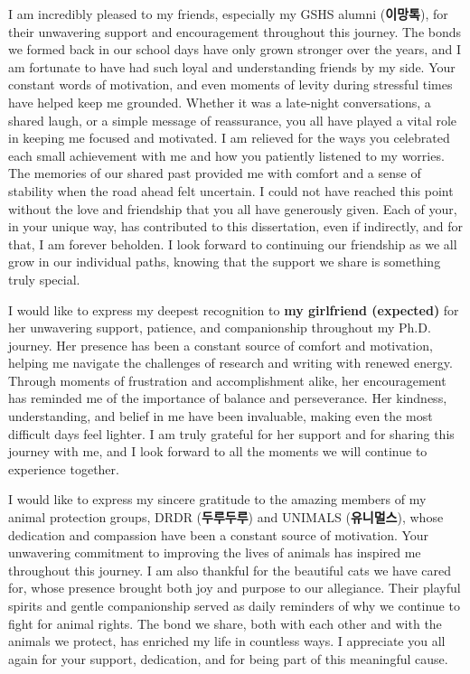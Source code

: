 \documentclass[11pt, a4paper, onecolumn, oneside]{report}
\begin{document}
        I am incredibly pleased to my friends, especially my GSHS alumni (\textbf{이망톡}), for their unwavering support and encouragement throughout this journey. The bonds we formed back in our school days have only grown stronger over the years, and I am fortunate to have had such loyal and understanding friends by my side. Your constant words of motivation, and even moments of levity during stressful times have helped keep me grounded. Whether it was a late-night conversations, a shared laugh, or a simple message of reassurance, you all have played a vital role in keeping me focused and motivated. I am relieved for the ways you celebrated each small achievement with me and how you patiently listened to my worries. The memories of our shared past provided me with comfort and a sense of stability when the road ahead felt uncertain. I could not have reached this point without the love and friendship that you all have generously given. Each of your, in your unique way, has contributed to this dissertation, even if indirectly, and for that, I am forever beholden. I look forward to continuing our friendship as we all grow in our individual paths, knowing that the support we share is something truly special.

        I would like to express my deepest recognition to \textbf{my girlfriend (expected)} for her unwavering support, patience, and companionship throughout my Ph.D. journey. Her presence has been a constant source of comfort and motivation, helping me navigate the challenges of research and writing with renewed energy. Through moments of frustration and accomplishment alike, her encouragement has reminded me of the importance of balance and perseverance. Her kindness, understanding, and belief in me have been invaluable, making even the most difficult days feel lighter. I am truly grateful for her support and for sharing this journey with me, and I look forward to all the moments we will continue to experience together.

        I would like to express my sincere gratitude to the amazing members of my animal protection groups, DRDR (\textbf{두루두루}) and UNIMALS (\textbf{유니멀스}), whose dedication and compassion have been a constant source of motivation. Your unwavering commitment to improving the lives of animals has inspired me throughout this journey. I am also thankful for the beautiful cats we have cared for, whose presence brought both joy and purpose to our allegiance. Their playful spirits and gentle companionship served as daily reminders of why we continue to fight for animal rights. The bond we share, both with each other and with the animals we protect, has enriched my life in countless ways. I appreciate you all again for your support, dedication, and for being part of this meaningful cause.
\end{document}
